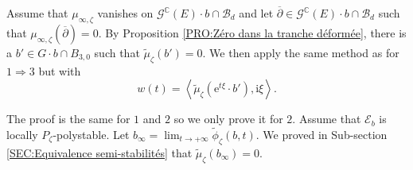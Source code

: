 \documentclass{article}
\theoremstyle{remark}
\theoremstyle{definition}
\newcommand{\C}{\mathbb{C}}
\renewcommand{\i}{\boldsymbol{\mathrm{i}}}
\newcommand{\e}{\boldsymbol{\mathrm{e}}}
\newcommand{\scal}[2]{\left< #1,#2 \right>}
\newcommand{\E}{\mathcal{E}}
\newcommand{\G}{\mathcal{G}}
\newcommand{\mB}{\mathcal{B}}
\newcommand{\dbar}{\overline{\partial}}
\begin{document}
\noindent{} Assume that $\mu_{\infty,\zeta}$ vanishes on $\G^\C(E) \cdot b \cap \mB_d$ and let $\dbar \in \G^\C(E) \cdot b \cap \mB_d$ such that $\mu_{\infty,\zeta}(\dbar) = 0$. By Proposition \ref{PRO:Zéro dans la tranche déformée}, there is a $b' \in G \cdot b \cap B_{3,0}$ such that $\tilde{\mu}_\zeta(b') = 0$. We then apply the same method as for $1 \Rightarrow 3$ but with
$$
w(t) = \scal{\tilde{\mu}_\zeta(\e^{t\xi} \cdot b')}{\i\xi}.
$$

\noindent{} The proof is the same for $1$ and $2$ so we only prove it for $2$. Assume that $\E_b$ is locally $P_\zeta$-polystable. Let $b_\infty = \lim_{t \rightarrow +\infty} \tilde{\phi}_\zeta(b,t)$. We proved in Sub-section \ref{SEC:Equivalence semi-stabilités} that $\tilde{\mu}_\zeta(b_\infty) = 0$.
\end{document}
